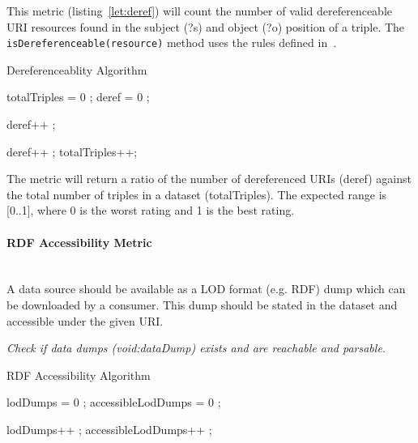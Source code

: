 This metric (listing~\ref{let:deref}) will count the number of valid dereferenceable URI resources found in the subject (?s) and object (?o) position of a triple. The \texttt{isDereferenceable(resource)} method uses the rules defined in~\cite{Yang2011}.
\begin{algorithm}
\caption{Dereferenceablity Algorithm}\label{lst:deref}
\begin{algorithmic}[1]
\State totalTriples = 0 ;
\State deref = 0 ;
\EndProcedure

 deref++ ; \EndIf

 deref++ ; \EndIf
\State totalTriples++;
\EndProcedure
\end{algorithmic}
\end{algorithm}
The metric will return a ratio of the number of dereferenced URIs (deref) against the total number of triples in a dataset (totalTriples). The expected range is [0..1], where 0 is the worst rating and 1 is the best rating.

\paragraph{RDF Accessibility Metric}~\\
A data source should be available as a LOD format (e.g. RDF) dump which can be downloaded by a consumer.
This dump should be stated in the dataset and accessible under the given URI.

\begin{mdframed}[style=metricdefinition]
\emph{Check if data dumps (void:dataDump) exists and are reachable and parsable.}
\end{mdframed}

\begin{algorithm}
\caption{RDF Accessibility Algorithm}\label{lst:deref}
\begin{algorithmic}[1]
\State lodDumps = 0 ;
\State accessibleLodDumps = 0 ;
\EndProcedure

 lodDumps++ ; \EndIf
{} accessibleLodDumps++ ; \EndIf
\EndProcedure
\end{algorithmic}
\end{algorithm}

